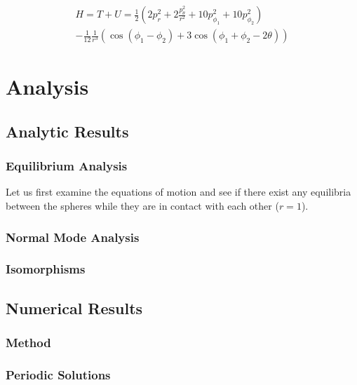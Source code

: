 \documentclass[12pt]{amsart}
\begin{document}
\begin{equation}
  \begin{multlined}
	H=T+U=
	\frac{1}{2}\left (
	2 p_r^2
	+2 \frac{p_\theta^2}{r^2}
	+10 p_{\phi_1}^2 
	+10 p_{\phi_2}^2      
        \right )
        \\
	-
	\frac{1}{12}
	\frac{1}{r^3}(
	        \cos(\phi_1-\phi_2)
	        +3\cos(\phi_1+\phi_2 -2\theta)
	    )
  \end{multlined}
\end{equation}

\section{Analysis}
\subsection{Analytic Results}

\subsubsection{Equilibrium Analysis}
Let us first examine the equations of motion and see if there exist any equilibria between the spheres while they are in contact with each other ($r=1$).
\subsubsection{Normal Mode Analysis}
\subsubsection{Isomorphisms}

\subsection{Numerical Results}
\subsubsection{Method}
\subsubsection{Periodic Solutions}
\end{document}
